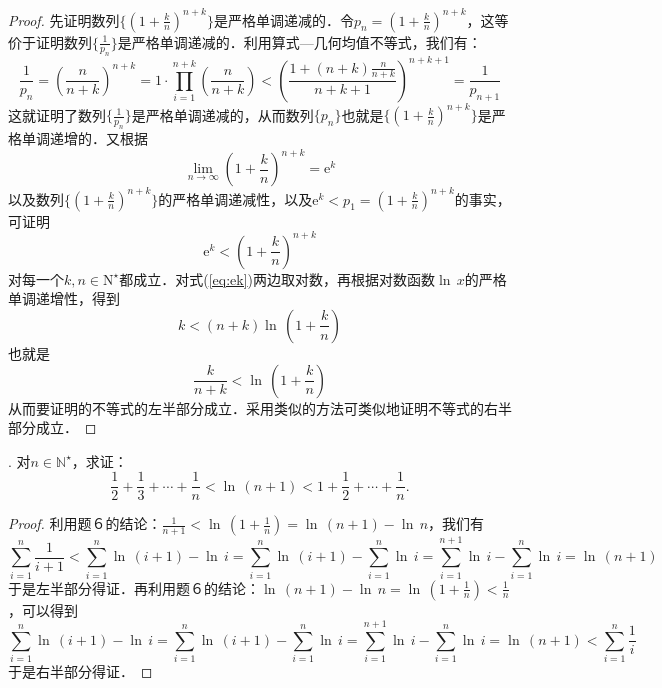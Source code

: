 \begin{proof}
先证明数列$\displaystyle \{ \left(1+\frac{k}{n}\right)^{n+k}\}$是严格单调递减的．令$\displaystyle p_n =  \left(1+\frac{k}{n}\right)^{n+k}$，这等价于证明数列$\displaystyle \{ \frac{1}{p_n} \}$是严格单调递减的．利用算式---几何均值不等式，我们有：
\begin{equation}
    \frac{1}{p_n} =  \left(\frac{n}{n+k}\right)^{n+k} = 1 \cdot \prod_{i=1}^{n+k} \left(\frac{n}{n+k}\right) <(\frac{1+(n+k) \frac{n}{n+k}}{n+k+1})^{n+k+1} = \frac{1}{p_{n+1}}
\end{equation}
这就证明了数列$\displaystyle \{ \frac{1}{p_n}\}$是严格单调递减的，从而数列$\{p_n \}$也就是$\{ \displaystyle \left(1+\frac{k}{n}\right)^{n+k}\}$是严格单调递增的．又根据
\begin{equation}
    \lim_{n \to \infty} \left(1+\frac{k}{n}\right)^{n+k} = \mathrm{e}^k
\end{equation}
以及数列$\{ \displaystyle \left( 1 + \frac{k}{n} \right)^{n+k}\}$的严格单调递减性，以及$\mathrm{e}^k < p_1 = \displaystyle \left(1+\frac{k}{n}\right)^{n+k}$的事实，可证明
\begin{equation}
    \mathrm{e}^k < \left( 1 + \frac{k}{n}\right)^{n+k}
    \label{eq:ek}
\end{equation}
对每一个$k, n\in \mathrm{N}^{\star}$都成立．对式(\ref{eq:ek})两边取对数，再根据对数函数$\ln \, x$的严格单调递增性，得到
\begin{equation}
    k < (n+k) \ln \, \left(1+\frac{k}{n}\right)
\end{equation}
也就是
\begin{equation}
    \frac{k}{n+k} < \ln \, \left(1+\frac{k}{n}\right)
\end{equation}
从而要证明的不等式的左半部分成立．采用类似的方法可类似地证明不等式的右半部分成立．
\end{proof}
. 对$n \in \mathbb{N}^\star$，求证：
\begin{equation}
    \frac{1}{2} + \frac{1}{3} + \cdots + \frac{1}{n} < \ln \, \left( n+1 \right) < 1 + \frac{1}{2} + \cdots + \frac{1}{n}.
\end{equation}
\begin{proof}
利用题６的结论：$\displaystyle \frac{1}{n+1} < \ln \, \left( 1 + \frac{1}{n} \right) = \ln \, (n+1) - \ln \, n$，我们有
\begin{equation}
\sum_{i = 1}^{n} \frac{1}{i + 1} < \sum_{i=1}^n \ln \, \left( i+1 \right) - \ln \, i = \sum_{i=1}^n \ln \, \left( i + 1\right) - \sum_{i=1}^n \ln \, i = \sum_{i=1}^{n+1} \ln \, i - \sum_{i=1}^{n} \ln \, i = \ln \, \left( n+1 \right)
\end{equation}
于是左半部分得证．再利用题６的结论：$\displaystyle \ln \, \left( n+1 \right) - \ln \, n = \ln \, \left( 1 + \frac{1}{n} \right) < \frac{1}{n}$，可以得到
\begin{equation}
\sum_{i=1}^n \ln \, \left( i+1 \right) - \ln \, i = \sum_{i=1}^n \ln \, \left( i+1 \right) - \sum_{i=1}^n \ln \, i = \sum_{i=1}^{n+1} \ln \, i - \sum_{i=1}^n \ln \, i = \ln \, \left(n+1 \right) < \sum_{i=1}^n \frac{1}{i}
\end{equation}
于是右半部分得证．
\end{proof}
